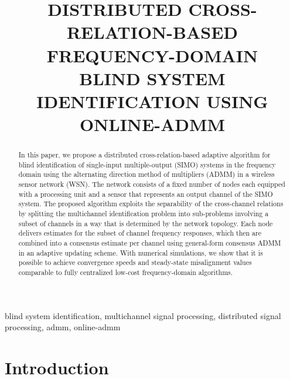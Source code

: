 \documentclass{article}
\title{DISTRIBUTED CROSS-RELATION-BASED FREQUENCY-DOMAIN\\ BLIND SYSTEM IDENTIFICATION USING ONLINE-ADMM}
\begin{document}
%
\maketitle
%
\begin{abstract}
    In this paper, we propose a distributed cross-relation-based adaptive algorithm for blind identification of single-input multiple-output (SIMO) systems in the frequency domain using the alternating direction method of multipliers (ADMM) in a wireless sensor network (WSN).
    The network consists of a fixed number of nodes each equipped with a processing unit and a sensor that represents an output channel of the SIMO system.
    The proposed algorithm exploits the separability of the cross-channel relations by splitting the multichannel identification problem into sub-problems involving a subset of channels in a way that is determined by the network topology.
    Each node delivers estimates for the subset of channel frequency responses, which then are combined into a consensus estimate per channel using general-form consensus ADMM in an adaptive updating scheme.
    With numerical simulations, we show that it is possible to achieve convergence speeds and steady-state misalignment values comparable to fully centralized low-cost frequency-domain algorithms.
\end{abstract}
%
\begin{keywords}
    blind system identification, multichannel signal processing, distributed signal processing, admm, online-admm
\end{keywords}
%
\section{Introduction}
\label{sec:intro}
\end{document}
